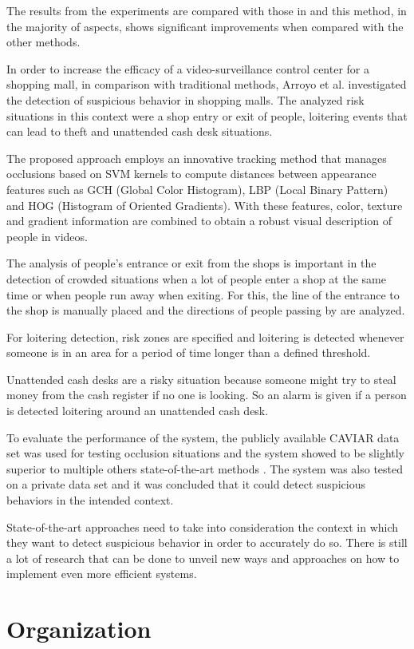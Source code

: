 The results from the experiments are compared with those in \cite{n8,n9,n10,n11} and this method, in the majority of aspects, shows significant improvements when compared with the other methods.

In order to increase the efficacy of a video-surveillance control center for a shopping mall, in comparison with traditional methods, Arroyo et al. \cite{n12} investigated the detection of suspicious behavior in shopping malls. The analyzed risk situations in this context were a shop entry or exit of people, loitering events that can lead to theft and unattended cash desk situations.

The proposed approach employs an innovative tracking method that manages occlusions based on SVM kernels to compute distances between appearance features such as GCH (Global Color Histogram), LBP (Local Binary Pattern) and HOG (Histogram of Oriented Gradients). With these features, color, texture and gradient information are combined to obtain a robust visual description of people in videos.

The analysis of people's entrance or exit from the shops is important in the detection of crowded situations when a lot of people enter a shop at the same time or when people run away when exiting. For this, the line of the entrance to the shop is manually placed and the directions of people passing by are analyzed.

For loitering detection, risk zones are specified and loitering is detected whenever someone is in an area for a period of time longer than a defined threshold.

Unattended cash desks are a risky situation because someone might try to steal money from the cash register if no one is looking. So an alarm is given if a person is detected loitering around an unattended cash desk.

To evaluate the performance of the system, the publicly available CAVIAR data set was used for testing occlusion situations and the system showed to be slightly superior to multiple others state-of-the-art methods \cite{n13,n14,n15}. The system was also tested on a private data set and it was concluded that it could detect suspicious behaviors in the intended context.

State-of-the-art approaches need to take into consideration the context in which they want to detect suspicious behavior in order to accurately do so. There is still a lot of research that can be done to unveil new ways and approaches on how to implement even more efficient systems.


\section{Organization}



